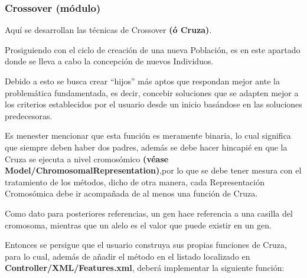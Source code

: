 \documentclass[letterpaper,10pt,english]{sphinxmanual}
\begin{document}
\subsubsection{Crossover (módulo)}
\label{Model/Operator/Crossover/Crossover::doc}\label{Model/Operator/Crossover/Crossover:crossover-modulo}
\begin{DUlineblock}{0em}
\item[] Aquí se desarrollan las técnicas de Crossover \textbf{(ó Cruza)}.
\item[] Prosiguiendo con el ciclo de creación de una nueva Población, es en este apartado donde
se lleva a cabo la concepción de nuevos Individuos.
\item[] 
\item[] Debido a esto se busca crear ``hijos'' más aptos que respondan mejor ante la problemática
fundamentada, es decir, concebir soluciones que se adapten mejor a los criterios establecidos
por el usuario desde un inicio basándose en las soluciones predecesoras.
\item[] 
\item[] Es menester mencionar que esta función es meramente binaria, lo cual significa que siempre
deben haber dos padres, además se debe hacer hincapié en que la Cruza se ejecuta a nivel
cromosómico \textbf{(véase Model/ChromosomalRepresentation)},por lo que se debe tener mesura
con el tratamiento de los métodos, dicho de otra manera, cada Representación Cromosómica debe ir
acompañada de al menos una función de Cruza.
\item[] 
\item[] Como dato para posteriores referencias, un gen hace referencia a una casilla del cromosoma,
mientras que un alelo es el valor que puede existir en un gen.
\item[] 
\item[] Entonces se persigue que el usuario construya sus propias funciones de Cruza, para lo cual,
además de añadir el método en el listado localizado en \textbf{Controller/XML/Features.xml}, deberá
implementar la siguiente función:
\end{DUlineblock}
\end{document}
